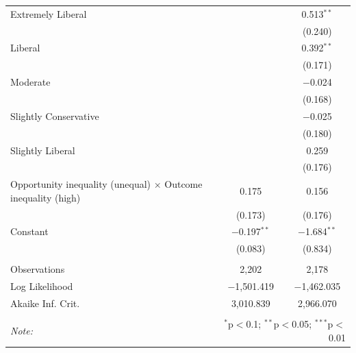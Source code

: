 \begin{table}[H]
\begin{tabular}{@{\extracolsep{5pt}}lcc}
  Extremely Liberal &  & 0.513$^{**}$ \\ 
  &  & (0.240) \\ 
  Liberal &  & 0.392$^{**}$ \\ 
  &  & (0.171) \\ 
  Moderate &  & $-$0.024 \\ 
  &  & (0.168) \\ 
  Slightly Conservative &  & $-$0.025 \\ 
  &  & (0.180) \\ 
  Slightly Liberal &  & 0.259 \\ 
  &  & (0.176) \\ 
  Opportunity inequality (unequal) × Outcome inequality (high) & 0.175 & 0.156 \\ 
  & (0.173) & (0.176) \\ 
  Constant & $-$0.197$^{**}$ & $-$1.684$^{**}$ \\ 
  & (0.083) & (0.834) \\ 
 \hline \\[-1.8ex] 
Observations & 2,202 & 2,178 \\ 
Log Likelihood & $-$1,501.419 & $-$1,462.035 \\ 
Akaike Inf. Crit. & 3,010.839 & 2,966.070 \\ 
\hline 
\hline \\[-1.8ex] 
\textit{Note:}  & \multicolumn{2}{r}{$^{*}$p$<$0.1; $^{**}$p$<$0.05; $^{***}$p$<$0.01} \\ 
\end{tabular} 
\end{table} 
